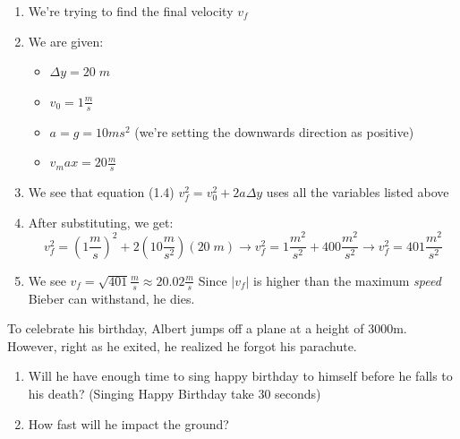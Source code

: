 \begin{solution}

\begin{enumerate}
    \item We're trying to find the final velocity $v_f$
    \item We are given:
    \begin{itemize}
        \item $\Delta y = 20\;m$
        \item $v_0 = 1\frac{m}{s}$
        \item $a = g = 10{m}{s^2}$ (we're setting the downwards direction as positive)
        \item $v_max = 20\frac{m}{s}$
    \end{itemize}
    \item We see that equation (1.4) $v_f^2 = v_0^2 + 2a\Delta y$ uses all the variables listed above
    \item After substituting, we get:
    \begin{equation}
        v_f^2 = (1\frac{m}{s})^2 + 2(10\frac{m}{s^2})(20\;m) \rightarrow
        v_f^2 = 1\frac{m^2}{s^2} + 400\frac{m^2}{s^2} \rightarrow
        v_f^2 = 401\frac{m^2}{s^2}
    \end{equation}
    \item We see $v_f = \sqrt{401}\frac{m}{s} \approx 20.02\frac{m}{s}$ Since $|v_f|$ is higher than the maximum \emph{speed} Bieber can withstand, he dies.
\end{enumerate}

\end{solution}


\begin{question}
To celebrate his birthday, Albert jumps off a plane at a height of 3000m. However, right as he exited, he realized he forgot his parachute.

\begin{enumerate}[label=(\alph*)]
\item Will he have enough time to sing happy birthday to himself before he falls to his death? (Singing Happy Birthday take 30 seconds)
\item How fast will he impact the ground?
\end{enumerate}

\end{question}

